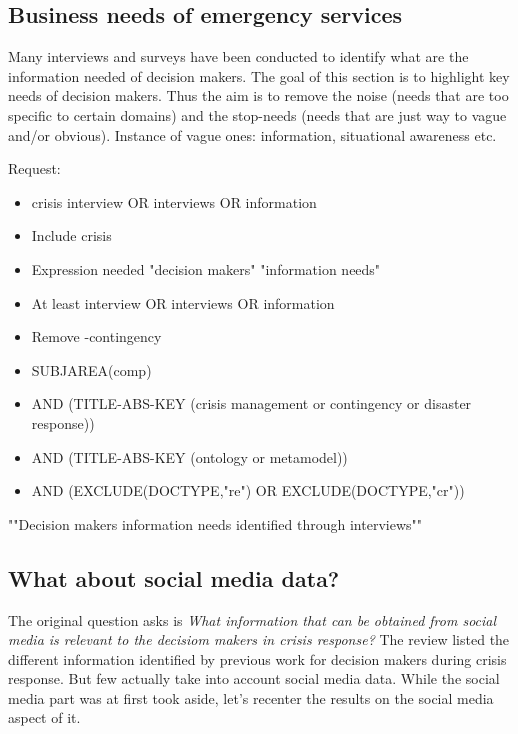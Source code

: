 \subsection{Business needs of emergency services}
Many interviews and surveys have been conducted to identify what are the information needed of decision makers.
The goal of this section is to highlight key needs of decision makers.
Thus the aim is to remove the noise (needs that are too specific to certain domains) and the stop-needs (needs that are just way to vague and/or obvious).
Instance of vague ones: information, situational awareness etc.

Request:
\begin{itemize}
    \item crisis interview OR interviews OR information
\end{itemize}
\begin{itemize}
    \item Include crisis
    \item Expression needed "decision makers" "information needs"
    \item At least interview OR interviews OR information
    \item Remove -contingency
\end{itemize}
\begin{itemize}
    \item SUBJAREA(comp)
    \item AND (TITLE-ABS-KEY ({crisis management} or contingency or {disaster response}))
    \item AND (TITLE-ABS-KEY (ontology or metamodel))
    \item AND (EXCLUDE(DOCTYPE,"re") OR EXCLUDE(DOCTYPE,"cr"))
\end{itemize}


""Decision makers information needs identified through interviews""

\subsection{What about social media data?}
The original question asks is \emph{What information that can be obtained from social media is relevant to the decisiom makers in crisis response?}
The review listed the different information identified by previous work for decision makers during crisis response.
But few actually take into account social media data.
While the social media part was at first took aside, let's recenter the results on the social media aspect of it.


